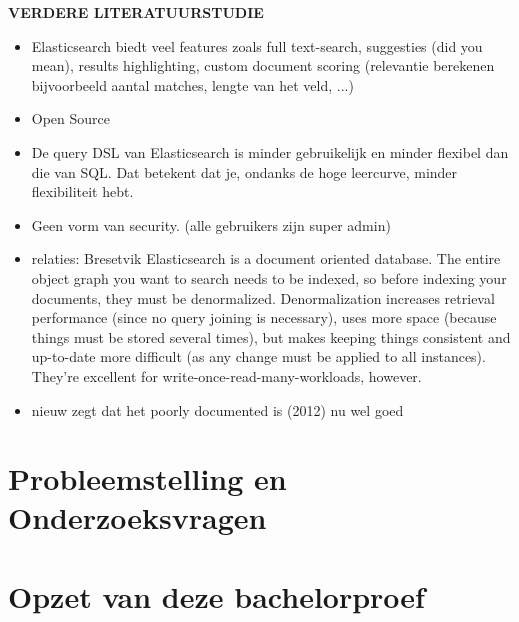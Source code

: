 \textbf{VERDERE LITERATUURSTUDIE}

\begin{itemize}
	\item Elasticsearch biedt veel features zoals full text-search, suggesties (did you mean), results highlighting, custom document scoring (relevantie berekenen bijvoorbeeld aantal matches, lengte van het veld, ...) 
	\item Open Source
	\item De query DSL van Elasticsearch is minder gebruikelijk en minder flexibel dan die van SQL. Dat betekent dat je, ondanks de hoge leercurve, minder flexibiliteit hebt.  
	\item Geen vorm van security. (alle gebruikers zijn super admin) 
	\item relaties: Bresetvik Elasticsearch is a document oriented database. The entire object graph you want to search needs to be indexed, so before indexing your documents, they must be denormalized. Denormalization increases retrieval performance (since no query joining is necessary), uses more space (because things must be stored several times), but makes keeping things consistent and up-to-date more difficult (as any change must be applied to all instances). They're excellent for write-once-read-many-workloads, however.
	\item nieuw zegt dat het poorly documented is (2012) nu wel goed
\end{itemize}




\section{Probleemstelling en Onderzoeksvragen}
\label{sec:onderzoeksvragen}


\section{Opzet van deze bachelorproef}
\label{sec:opzet-bachelorproef}



